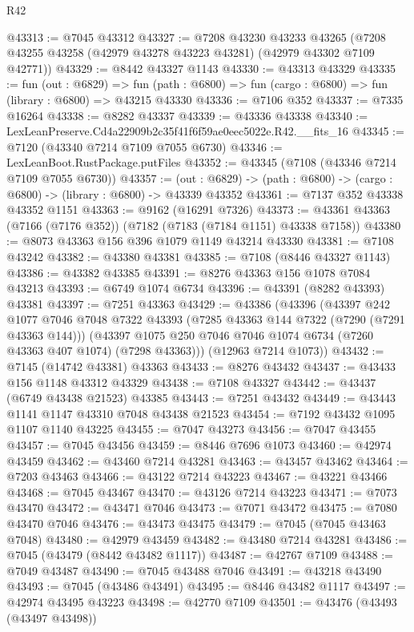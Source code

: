 \begin{lexlean}{R42}
\begin{coremodule}
{@43313 := @7045 @43312
@43327 := @7208
    @43230
    @43233
    @43265
    (@7208 @43255 @43258 (@42979 @43278 @43223 @43281) (@42979 @43302 @7109 @42771))
@43329 := @8442 @43327 @1143
@43330 := @43313 @43329
@43335 := fun (out : @6829) =>
  fun (path : @6800) => fun (cargo : @6800) => fun (library : @6800) => @43215 @43330
@43336 := @7106 @352
@43337 := @7335 @16264
@43338 := @8282 @43337
@43339 := @43336 @43338
@43340 := LexLeanPreserve.Cd4a22909b2c35f41f6f59ae0eec5022e.R42.__fits_16
@43345 := @7120 (@43340 @7214 @7109 @7055 @6730)
@43346 := LexLeanBoot.RustPackage.putFiles
@43352 := @43345 (@7108 (@43346 @7214 @7109 @7055 @6730))
@43357 := (out : @6829) -> (path : @6800) -> (cargo : @6800) -> (library : @6800) -> @43339 @43352
@43361 := @7137 @352 @43338 @43352 @1151
@43363 := @9162 (@16291 @7326)
@43373 := @43361 @43363 (@7166 (@7176 @352)) (@7182 (@7183 (@7184 @1151) @43338 @7158))
@43380 := @8073 @43363 @156 @396 @1079 @1149 @43214 @43330
@43381 := @7108 @43242
@43382 := @43380 @43381
@43385 := @7108 (@8446 @43327 @1143)
@43386 := @43382 @43385
@43391 := @8276 @43363 @156 @1078 @7084 @43213
@43393 := @6749 @1074 @6734
@43396 := @43391 (@8282 @43393) @43381
@43397 := @7251 @43363
@43429 := @43386
    (@43396
      (@43397
        @242
        @1077
        @7046
        @7048
        @7322
        @43393
        (@7285 @43363 @144 @7322 (@7290 (@7291 @43363 @144)))
        (@43397 @1075 @250 @7046 @7046 @1074 @6734 (@7260 @43363 @407 @1074) (@7298 @43363)))
      (@12963 @7214 @1073))
@43432 := @7145 (@14742 @43381) @43363
@43433 := @8276 @43432
@43437 := @43433 @156 @1148 @43312 @43329
@43438 := @7108 @43327
@43442 := @43437 (@6749 @43438 @21523) @43385
@43443 := @7251 @43432
@43449 := @43443 @1141 @1147 @43310 @7048 @43438 @21523
@43454 := @7192 @43432 @1095 @1107 @1140 @43225
@43455 := @7047 @43273
@43456 := @7047 @43455
@43457 := @7045 @43456
@43459 := @8446 @7696 @1073
@43460 := @42974 @43459
@43462 := @43460 @7214 @43281
@43463 := @43457 @43462
@43464 := @7203 @43463
@43466 := @43122 @7214 @43223
@43467 := @43221 @43466
@43468 := @7045 @43467
@43470 := @43126 @7214 @43223
@43471 := @7073 @43470
@43472 := @43471 @7046
@43473 := @7071 @43472
@43475 := @7080 @43470 @7046
@43476 := @43473 @43475
@43479 := @7045 (@7045 @43463 @7048)
@43480 := @42979 @43459
@43482 := @43480 @7214 @43281
@43486 := @7045 (@43479 (@8442 @43482 @1117))
@43487 := @42767 @7109
@43488 := @7049 @43487
@43490 := @7045 @43488 @7046
@43491 := @43218 @43490
@43493 := @7045 (@43486 @43491)
@43495 := @8446 @43482 @1117
@43497 := @42974 @43495 @43223
@43498 := @42770 @7109
@43501 := @43476 (@43493 (@43497 @43498))
}
\end{coremodule}
\end{lexlean}
